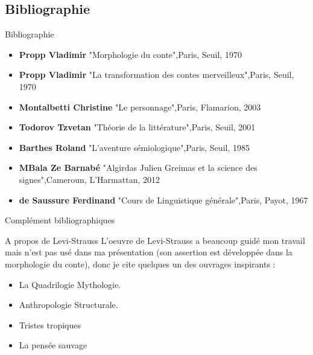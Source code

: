 \documentclass{beamer}
\begin{document}
\subsection{Bibliographie}
\begin{frame}{Bibliographie}
  \scriptsize
  \begin{itemize}
    \item \textbf{Propp Vladimir} "Morphologie du conte",\newline Paris, Seuil, 1970
    \item \textbf{Propp Vladimir} "La transformation des contes merveilleux",\newline Paris, Seuil, 1970
    \item \textbf{Montalbetti Christine} "Le personnage",\newline Paris, Flamarion, 2003
    \item \textbf{Todorov Tzvetan} "Théorie de la littérature",\newline Paris, Seuil, 2001
    \item \textbf{Barthes Roland} "L'aventure sémiologique",\newline Paris, Seuil, 1985
    \item \textbf{MBala Ze Barnabé} "Algirdas Julien Greimas et la science des signes",\newline Cameroun, L'Harmattan, 2012
    \item \textbf{de Saussure Ferdinand} "Cours de Linguistique générale",\newline Paris, Payot, 1967
  \end{itemize}
\end{frame}

\begin{frame}{Complément bibliographiques}
  \begin{block}{A propos de Levi-Strauss}
    L'oeuvre de Levi-Strauss a beaucoup guidé mon travail mais n'est pas usé dans ma présentation (son assertion est développée dans la morphologie du conte), donc je cite quelques un des ouvrages inspirants : 
    \begin{itemize}
      \item La Quadrilogie Mythologie.
      \item Anthropologie Structurale.
      \item Tristes tropiques
      \item La pensée sauvage
    \end{itemize}
  \end{block}
  
\end{frame}
\end{document}
